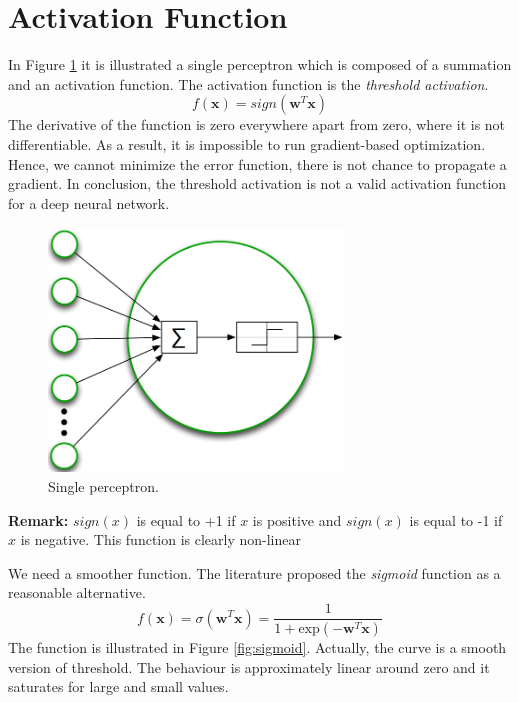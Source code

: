 \section{Activation Function}
In Figure \ref{fig:perceptron_activation_function} it is illustrated a single perceptron which is composed of a summation and an activation function. The activation function is the \textit{threshold activation}.
$$f(\pmb{x}) = \mathit{sign}(\pmb{w}^T \pmb{x})$$
The derivative of the function is zero everywhere apart from zero, where it is not differentiable. As a result, it is impossible to run gradient-based optimization. Hence, we cannot minimize the error function, there is not chance to propagate a gradient. In conclusion, the threshold activation is not a valid activation function for a deep neural network. \newline

\begin{figure}
    \centering
    \includegraphics[width=0.7\textwidth]{images/perceptron_activation_function.png}
    \caption{Single perceptron.}
    \label{fig:perceptron_activation_function}
\end{figure}

\textbf{Remark:} $\mathit{sign(x)}$ is equal to +1 if $x$ is positive and $\mathit{sign(x)}$ is equal to -1 if $x$ is negative. This function is clearly non-linear \newline

We need a smoother function. The literature proposed the \textit{sigmoid} function as a reasonable alternative.
\begin{equation}
    f(\pmb{x}) = \sigma(\pmb{w}^T \pmb{x}) = \frac{1}{1+\text{exp}(-\pmb{w}^T \pmb{x})}
\end{equation}
The function is illustrated in Figure \ref{fig:sigmoid}. Actually, the curve is a smooth version of threshold. The behaviour is approximately linear around zero and it saturates for large and small values. \newline

